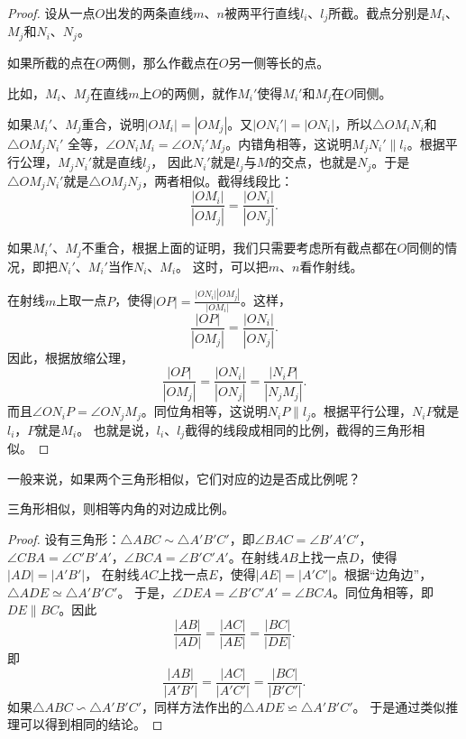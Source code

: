 \documentclass[12pt,UTF8]{ctexbook}
\begin{document}
\begin{proof}
    设从一点$O$出发的两条直线$m$、$n$被两平行直线$l_i$、$l_j$所截。截点分别是$M_i$、$M_j$和$N_i$、$N_j$。
    
    如果所截的点在$O$两侧，那么作截点在$O$另一侧等长的点。

    比如，$M_i$、$M_j$在直线$m$上$O$的两侧，就作$M_i'$使得$M_i'$和$M_j$在$O$同侧。

    如果$M_i'$、$M_j$重合，说明$|OM_i| = |OM_j|$。又$|ON_i'| = |ON_i|$，所以$\triangle OM_iN_i$和$\triangle OM_jN_i'$
    全等，$\angle ON_iM_i = \angle ON_i'M_j$。内错角相等，这说明$M_jN_i' \parallel l_i$。根据平行公理，$M_jN_i'$就是直线$l_j$，
    因此$N_i'$就是$l_j$与$M$的交点，也就是$N_j$。于是$\triangle OM_jN_i'$就是$\triangle OM_jN_j$，两者相似。截得线段比：
    $$ \frac{|OM_i|}{|OM_j|} = \frac{|ON_i|}{|ON_j|}.$$

    如果$M_i'$、$M_j$不重合，根据上面的证明，我们只需要考虑所有截点都在$O$同侧的情况，即把$N_i'$、$M_i'$当作$N_i$、$M_i$。
    这时，可以把$m$、$n$看作射线。

    在射线$m$上取一点$P$，使得$|OP| = \frac{|ON_i||OM_j|}{|OM_i|}$。这样，
    $$ \frac{|OP|}{|OM_j|} = \frac{|ON_i|}{|ON_j|}.$$
    因此，根据放缩公理，
    $$ \frac{|OP|}{|OM_j|} = \frac{|ON_i|}{|ON_j|} = \frac{|N_iP|}{|N_jM_j|}.$$
    而且$\angle ON_iP = \angle ON_jM_j$。同位角相等，这说明$N_iP \parallel l_j$。根据平行公理，$N_iP$就是$l_i$，$P$就是$M_i$。
    也就是说，$l_i$、$l_j$截得的线段成相同的比例，截得的三角形相似。

\end{proof}

一般来说，如果两个三角形相似，它们对应的边是否成比例呢？
\begin{tm}\label{tm:0-0-1}
    三角形相似，则相等内角的对边成比例。
\end{tm}
\begin{proof}
    设有三角形：$\triangle ABC \sim \triangle A'B'C'$，即$\angle BAC = \angle B'A'C'$，
    $\angle CBA = \angle C'B'A'$，$\angle BCA = \angle B'C'A'$。在射线$AB$上找一点$D$，使得$|AD| = |A'B'|$，
    在射线$AC$上找一点$E$，使得$|AE| = |A'C'|$。根据“边角边”，$\triangle ADE \simeq \triangle A'B'C'$。
    于是，$\angle DEA = \angle B'C'A' = \angle BCA$。同位角相等，即$DE \parallel BC$。因此
    $$ \frac{|AB|}{|AD|} = \frac{|AC|}{|AE|} = \frac{|BC|}{|DE|}.$$
    即
    $$ \frac{|AB|}{|A'B'|} = \frac{|AC|}{|A'C'|} = \frac{|BC|}{|B'C'|}.$$
    如果$\triangle ABC \backsim \triangle A'B'C'$，同样方法作出的$\triangle ADE \backsimeq \triangle A'B'C'$。
    于是通过类似推理可以得到相同的结论。
\end{proof}
\end{document}
